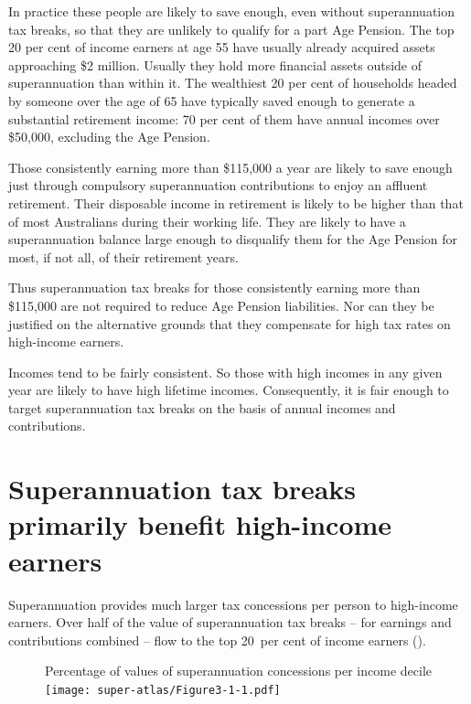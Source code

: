 In practice these people are likely to save enough, even without superannuation tax breaks, so that they are unlikely to qualify for a part Age Pension. The top 20 per cent of income earners at age 55 have usually already acquired assets approaching \$2 million. Usually they hold more financial assets outside of superannuation than within it. The wealthiest 20 per cent of households headed by someone over the age of 65 have typically saved enough to generate a substantial retirement income: 70 per cent of them have annual incomes over \$50,000, excluding the Age Pension.

Those consistently earning more than \$115,000 a year are likely to save enough just through compulsory superannuation contributions to enjoy an affluent retirement. Their disposable income in retirement is likely to be higher than that of most Australians during their working life. They are likely to have a superannuation balance large enough to disqualify them for the Age Pension for most, if not all, of their retirement years. 

Thus superannuation tax breaks for those consistently earning more than \$115,000 are not required to reduce Age Pension liabilities. Nor can they be justified on the alternative grounds that they compensate for high tax rates on high-income earners.

Incomes tend to be fairly consistent. So those with high incomes in any given year are likely to have high lifetime incomes. Consequently, it is fair enough to target superannuation tax breaks on the basis of annual incomes and contributions.

\section{Superannuation tax breaks primarily benefit high-income earners}
Superannuation provides much larger tax concessions per person to high-income earners. Over half of the value of superannuation tax breaks – for earnings and contributions combined – flow to the top 20~per cent of income earners (). \oneraggedpage

\begin{figure}[hbp]
%
{Percentage of values of superannuation concessions per income decile}\label{fig:SUPER-3-1}
\texttt{[image: super-atlas/Figure3-1-1.pdf]}

\end{figure}

